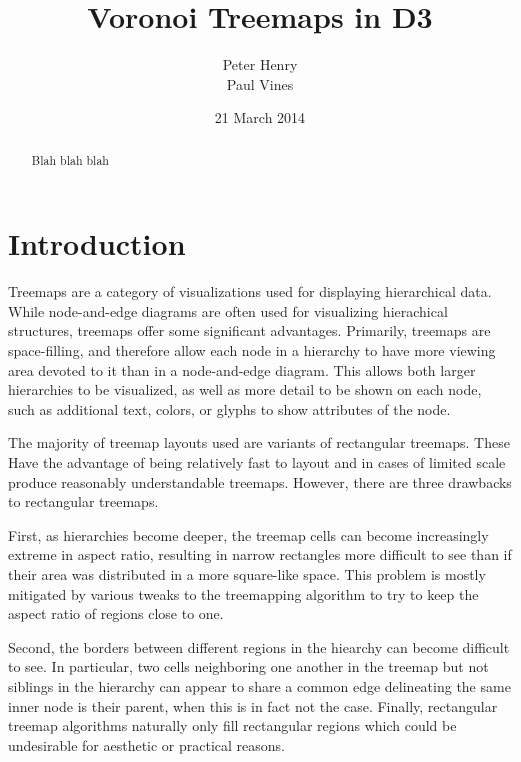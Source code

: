\documentclass{acm_proc_article-sp}
\begin{document}
\title{Voronoi Treemaps in D3}

\author{
\alignauthor
Peter Henry
       \\
\alignauthor
Paul Vines
       \\
}
\date{21 March 2014}

\maketitle
\begin{abstract}
Blah blah blah
\end{abstract}


\section{Introduction}
Treemaps are a category of visualizations used for displaying
hierarchical data. While node-and-edge diagrams are often used for
visualizing hierachical structures, treemaps offer some significant
advantages. Primarily, treemaps are space-filling, and therefore allow
each node in a hierarchy to have more viewing area devoted to it than
in a node-and-edge diagram. This allows both larger hierarchies to be
visualized, as well as more detail to be shown on each node, such as
additional text, colors, or glyphs to show attributes of the
node. 

The majority of treemap layouts used are variants of rectangular
treemaps. These Have the advantage of being relatively fast to layout
and in cases of limited scale produce reasonably understandable
treemaps. However, there are three drawbacks to rectangular
treemaps. 

First, as hierarchies become deeper, the treemap cells can
become increasingly extreme in aspect ratio, resulting in narrow
rectangles more difficult to see than if their area was distributed in
a more square-like space. This problem is mostly mitigated by various
tweaks to the treemapping algorithm to try to keep the aspect ratio of
regions close to one. 

Second, the borders between different regions in the hiearchy can
become difficult to see. In particular, two cells
neighboring one another in the treemap but not siblings in the
hierarchy can appear to share a common edge delineating the same inner
node is their parent, when this is in fact not the case. 
Finally, rectangular treemap algorithms naturally only fill
rectangular regions which could be undesirable for aesthetic or
practical reasons.
\end{document}
